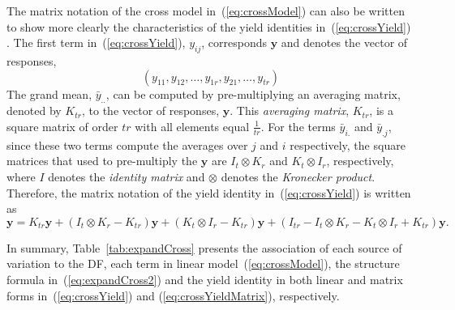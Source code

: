\documentclass[article]{jss}
\begin{document}
The matrix notation of the cross model in~(\ref{eq:crossModel}) can also be written to show more clearly the characteristics of the yield identities in~(\ref{eq:crossYield}) \citep{Nelder1965A}. The first term  in~(\ref{eq:crossYield}), $y_{ij}$, corresponds $\bm{y}$ and denotes the vector of responses,
\[
(y_{11}, y_{12}, \dots, y_{1r}, y_{21}, \dots, y_{tr}) 
\]
The grand mean, $\bar{y}_{..}$, can be computed by pre-multiplying an averaging matrix, denoted by $K_{tr}$, to the vector of responses, $\bm{y}$. This \emph{averaging matrix}, $K_{tr}$, is a square matrix of order $tr$ with all elements equal $\frac{1}{tr}$. For the terms $\bar{y}_{i.}$ and $\bar{y}_{.j}$, since these two terms compute the averages over $j$ and $i$ respectively, the square matrices that used to pre-multiply the $\bm{y}$ are $I_{t} \otimes K_{r}$ and $K_{t} \otimes I_{r}$, respectively, where $I$ denotes the \emph{identity matrix} and $\otimes$ denotes the \emph{Kronecker product}. Therefore, the matrix notation of the yield identity in~(\ref{eq:crossYield}) is written as 
\begin{equation}\label{eq:crossYieldMatrix}
\bm{y} = K_{tr}\bm{y} + (I_{t} \otimes K_{r} - K_{tr})\bm{y} + (K_{t} \otimes I_{r} - K_{tr})\bm{y} + (I_{tr} - I_{t} \otimes K_{r} - K_{t} \otimes I_{r} + K_{tr})\bm{y}.
\end{equation}

In summary, Table~\ref{tab:expandCross} presents the association of each source of variation to the DF, each term in linear model~(\ref{eq:crossModel}), the structure formula in~(\ref{eq:expandCross2}) and the yield identity in both linear and matrix forms in~(\ref{eq:crossYield}) and (\ref{eq:crossYieldMatrix}), respectively.
\end{document}

